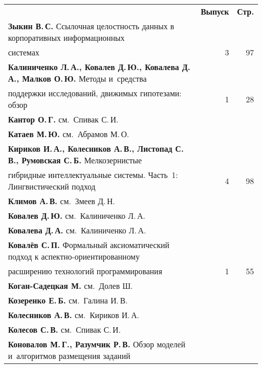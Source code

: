{\tabcolsep=3pt
\begin{tabular}{p{388pt}rr}
&\textbf{Выпуск} & \textbf{Стр.}\\[2.3pt]
\textbf{Зыкин В.\,С.} Ссылочная целостность данных в корпоративных
информационных\linebreak
\\[-12.35pt]
\hspace*{21pt}сис\-те\-мах&3&97\\[-.75pt]
\textbf{Калиниченко Л.\,А., Ковалев Д.\,Ю., Ковалева Д.\,А., Малков
О.\,Ю.} Методы и~средства\linebreak
\\[-12.35pt]
\hspace*{21pt}поддержки исследований, движимых гипотезами:
обзор&1&28\\[-.75pt]
\textbf{Кантор О.\,Г.} см.\ Спивак С.\,И.&&\\[-.75pt]
\textbf{Катаев М.\,Ю.} см.\ Абрамов М.\,О.&&\\[-.75pt]
\textbf{Кириков И.\,А., Колесников А.\,В., Листопад С.\,В., Румовская
С.\,Б.} Мелкозернистые\linebreak
\\[-12.35pt]
\hspace*{21pt}гибридные интеллектуальные сис\-те\-мы. Часть~1:
Лингвистический подход&4&98\\[-.75pt]
\textbf{Климов А.\,В.} см.\ Змеев Д.\,Н.&&\\[-.75pt]
\textbf{Ковалев Д.\,Ю.} см.\ Калиниченко Л.\,А.&&\\[-.75pt]
\textbf{Ковалева Д.\,А.} см.\ Калиниченко Л.\,А.&&\\[-.75pt]
\textbf{Ковалёв С.\,П.} Формальный аксиоматический подход к
аспектно-ориентированному\linebreak
\\[-12.35pt]
\hspace*{21pt}расширению технологий программирования&1&55\\[-.75pt]
\textbf{Коган-Садецкая М.} см.\ Долев Ш.&&\\[-.75pt]
\textbf{Козеренко Е.\,Б.} см.\ Галина И.\,В.&&\\[-.75pt]
\textbf{Колесников А.\,В.} см.\ Кириков И.\,А.&&\\[-.75pt]
\textbf{Колесов С.\,В.} см.\ Спивак С.\,И.&&\\[-.75pt]
\textbf{Коновалов М.\,Г., Разумчик Р.\,В.} Обзор моделей и~алгоритмов
размещения заданий\linebreak
\\[-12.35pt]

\end{tabular}}
